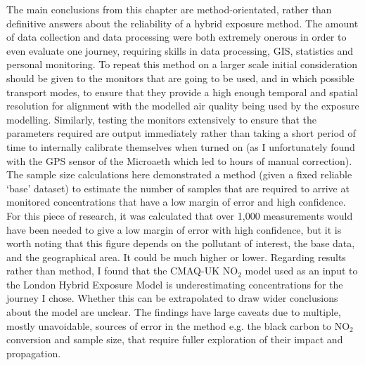 The main conclusions from this chapter are method-orientated, rather than definitive answers about the reliability of a hybrid exposure method. The amount of data collection and data processing were both extremely onerous in order to even evaluate one journey, requiring skills in data processing, GIS, statistics and personal monitoring. To repeat this method on a larger scale initial consideration should be given to the monitors that are going to be used, and in which possible transport modes, to ensure that they provide a high enough temporal and spatial resolution for alignment with the modelled air quality being used by the exposure modelling. Similarly, testing the monitors extensively to ensure that the parameters required are output immediately rather than taking a short period of time to internally calibrate themselves when turned on (as I unfortunately found with the GPS sensor of the Microaeth which led to hours of manual correction).
The sample size calculations here demonstrated a method (given a fixed reliable ‘base’ dataset) to estimate the number of samples that are required to arrive at monitored concentrations that have a low margin of error and high confidence. For this piece of research, it was calculated that over 1,000 measurements would have been needed to give a low margin of error with high confidence, but it is worth noting that this figure depends on the pollutant of interest, the base data, and the geographical area. It could be much higher or lower. 
Regarding results rather than method, I found that the CMAQ-UK NO$_{2}$ model used as an input to the London Hybrid Exposure Model is underestimating concentrations for the journey I chose. Whether this can be extrapolated to draw wider conclusions about the model are unclear. The findings have large caveats due to multiple, mostly unavoidable, sources of error in the method e.g. the black carbon to NO$_{2}$ conversion and sample size, that require fuller exploration of their impact and propagation.

